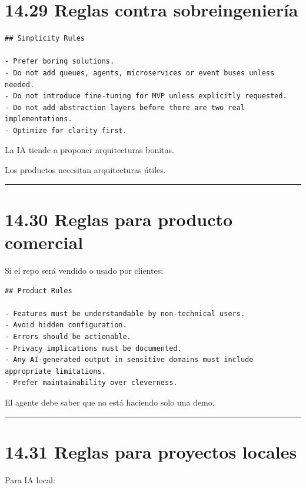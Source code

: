 \section{14.29 Reglas contra
sobreingeniería}\label{reglas-contra-sobreingenieruxeda}

\begin{lstlisting}
## Simplicity Rules

- Prefer boring solutions.
- Do not add queues, agents, microservices or event buses unless needed.
- Do not introduce fine-tuning for MVP unless explicitly requested.
- Do not add abstraction layers before there are two real implementations.
- Optimize for clarity first.
\end{lstlisting}

La IA tiende a proponer arquitecturas bonitas.

Los productos necesitan arquitecturas útiles.

\begin{center}\rule{0.5\linewidth}{0.5pt}\end{center}

\section{14.30 Reglas para producto
comercial}\label{reglas-para-producto-comercial}

Si el repo será vendido o usado por clientes:

\begin{lstlisting}
## Product Rules

- Features must be understandable by non-technical users.
- Avoid hidden configuration.
- Errors should be actionable.
- Privacy implications must be documented.
- Any AI-generated output in sensitive domains must include appropriate limitations.
- Prefer maintainability over cleverness.
\end{lstlisting}

El agente debe saber que no está haciendo solo una demo.

\begin{center}\rule{0.5\linewidth}{0.5pt}\end{center}

\section{14.31 Reglas para proyectos
locales}\label{reglas-para-proyectos-locales}

Para IA local:

